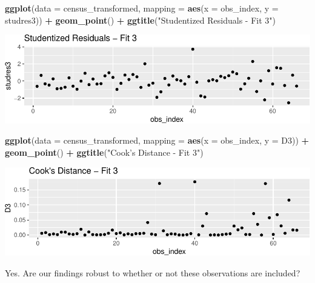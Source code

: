 \documentclass[landscape]{article}
\newenvironment{Shaded}{\begin{snugshade}}{\end{snugshade}}
\newcommand{\KeywordTok}[1]{\textcolor[rgb]{0.13,0.29,0.53}{\textbf{#1}}}
\newcommand{\DataTypeTok}[1]{\textcolor[rgb]{0.13,0.29,0.53}{#1}}
\newcommand{\StringTok}[1]{\textcolor[rgb]{0.31,0.60,0.02}{#1}}
\newcommand{\OperatorTok}[1]{\textcolor[rgb]{0.81,0.36,0.00}{\textbf{#1}}}
\newcommand{\NormalTok}[1]{#1}
\begin{document}
\begin{Shaded}
\begin{Highlighting}[]
\KeywordTok{ggplot}\NormalTok{(}\DataTypeTok{data =}\NormalTok{ census_transformed, }\DataTypeTok{mapping =} \KeywordTok{aes}\NormalTok{(}\DataTypeTok{x =}\NormalTok{ obs_index, }\DataTypeTok{y =}\NormalTok{ studres3)) }\OperatorTok{+}
\StringTok{  }\KeywordTok{geom_point}\NormalTok{() }\OperatorTok{+}
\StringTok{  }\KeywordTok{ggtitle}\NormalTok{(}\StringTok{"Studentized Residuals - Fit 3"}\NormalTok{)}
\end{Highlighting}
\end{Shaded}

\includegraphics{20190422_multicollinearity_files/figure-latex/unnamed-chunk-20-2.pdf}

\begin{Shaded}
\begin{Highlighting}[]
\KeywordTok{ggplot}\NormalTok{(}\DataTypeTok{data =}\NormalTok{ census_transformed, }\DataTypeTok{mapping =} \KeywordTok{aes}\NormalTok{(}\DataTypeTok{x =}\NormalTok{ obs_index, }\DataTypeTok{y =}\NormalTok{ D3)) }\OperatorTok{+}
\StringTok{  }\KeywordTok{geom_point}\NormalTok{() }\OperatorTok{+}
\StringTok{  }\KeywordTok{ggtitle}\NormalTok{(}\StringTok{"Cook's Distance - Fit 3"}\NormalTok{)}
\end{Highlighting}
\end{Shaded}

\includegraphics{20190422_multicollinearity_files/figure-latex/unnamed-chunk-20-3.pdf}

Yes. Are our findings robust to whether or not these observations are
included?
\end{document}
